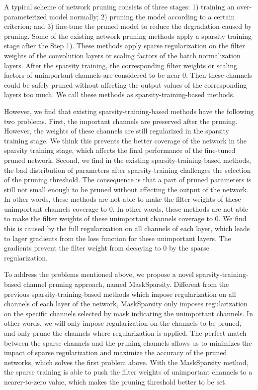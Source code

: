 \documentclass[review]{cvpr}
\begin{document}
A typical scheme of network pruning consists of three stages: 1) training an over-parameterized model normally; 2) pruning the model according to a certain criterion; and 3) fine-tune the pruned model to reduce the degradation caused by pruning. Some of the existing network pruning methods apply a sparsity training stage after the Step 1). These methods apply sparse regularization on the filter weights of the convolution layers \cite{alvarez2016learning,wen2016learning} or scaling factors \cite{huang2018data,liu2017learning} of the batch normalization layers. After the sparsity training, the corresponding filter weights or scaling factors of unimportant channels are considered to be near 0. Then these channels could be safely pruned without affecting the output values of the corresponding layers too much. We call these methods as sparsity-training-based methods. 
 
However, we find that existing sparsity-training-based methods have the following two problems. First, the important channels are preserved after the pruning. However, the weights of these channels are still regularized in the sparsity training stage. We think this prevents the better coverage of the network in the sparsity training stage, which affects the final performance of the fine-tuned pruned network. Second, we find in the existing sparsity-training-based methods, the bad distribution of parameters after sparsity-training challenges the selection of the pruning threshold. The consequence is that a part of pruned parameters is still not small enough to be pruned without affecting the output of the network. In other words, these methods are not able to make the filter weights of these unimportant channels coverage to 0. In other words, these methods are not able to make the filter weights of these unimportant channels coverage to 0. We find this is caused by the full regularization on all channels of each layer, which leads to lager gradients from the loss function for these unimportant layers. The gradients prevent the filter weight from decaying to 0 by the sparse regularization.


To address the problems mentioned above, we propose a novel sparsity-training-based channel pruning approach, named MaskSparsity. Different from the previous sparsity-training-based methods which impose regularization on all channels of each layer of the network, MaskSparsity only imposes regularization on the specific channels selected by mask indicating the unimportant channels. In other words, we will only impose regularization on the channels to be pruned, and only prune the channels where regularization is applied. The perfect match between the sparse channels and the pruning channels allows us to minimizes the impact of sparse regularization and maximize the accuracy of the pruned networks, which solves the first problem above. With the MaskSparsity method, the sparse training is able to push the filter weights of unimportant channels to a nearer-to-zero value, which makes the pruning threshold better to be set.
\end{document}
